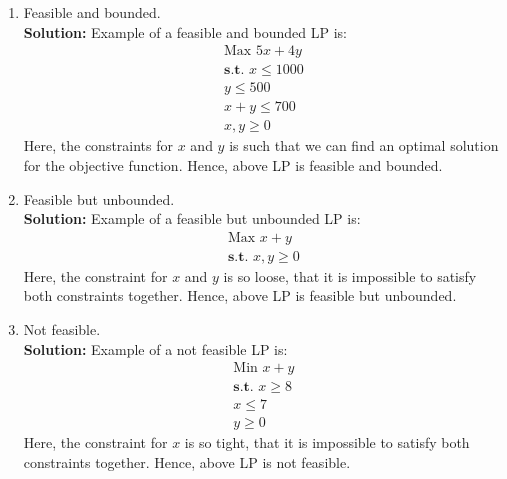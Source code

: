 \documentclass[12pt]{article}
\begin{document}
\begin{enumerate}
\begin{enumerate}
\begin{enumerate}
\item Feasible and bounded. \\
\textbf{Solution:} Example of a feasible and bounded LP is:\\
\begin{align*}
\text{Max }5x + 4y\\
\textbf{s.t. } x \leq 1000\\
y \leq 500\\
x + y \leq 700\\
x,y \geq 0
\end{align*}
Here, the constraints for $x$ and $y$ is such that we can find an optimal solution for the objective function. Hence, above LP is feasible and bounded.
\item Feasible but unbounded.\\
\textbf{Solution:} Example of a feasible but unbounded LP is:\\
\begin{align*}
\text{Max }x + y\\
\textbf{s.t. }x,y \geq 0
\end{align*}
Here, the constraint for $x$ and $y$ is so loose, that it is impossible to satisfy both constraints together. Hence, above LP is feasible but unbounded.
\item Not feasible.\\
\textbf{Solution:} Example of a not feasible LP is:\\
\begin{align*}
\text{Min }x + y\\
\textbf{s.t. }x \geq 8\\
x \leq 7\\
y \geq 0
\end{align*}
Here, the constraint for $x$ is so tight, that it is impossible to satisfy both constraints together. Hence, above LP is not feasible.\\
\end{enumerate}
\end{enumerate}


\end{enumerate}
\end{document}
